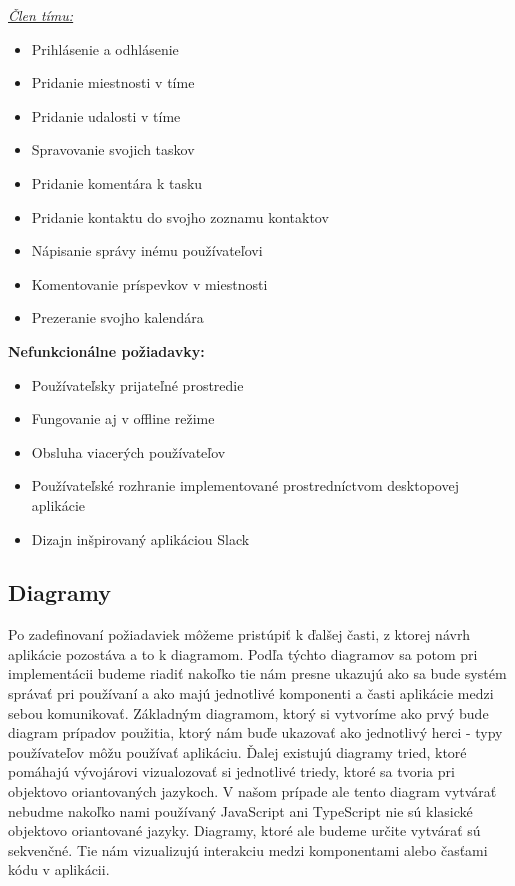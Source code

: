 \underline{\textit{Člen tímu:}}
\indent\begin{itemize}
    \item Prihlásenie a odhlásenie
    \item Pridanie miestnosti v tíme 
    \item Pridanie udalosti v tíme
    \item Spravovanie svojich taskov
    \item Pridanie komentára k tasku
    \item Pridanie kontaktu do svojho zoznamu kontaktov
    \item Nápisanie správy inému používateľovi
    \item Komentovanie príspevkov v miestnosti
    \item Prezeranie svojho kalendára\newline
\end{itemize}


\textbf{Nefunkcionálne požiadavky:}
\indent\begin{itemize}
    \item Používateľsky prijateľné prostredie
    \item Fungovanie aj v offline režime
    \item Obsluha viacerých používateľov
    \item Používateľské rozhranie implementované prostredníctvom desktopovej aplikácie
    \item Dizajn inšpirovaný aplikáciou Slack
\end{itemize}

\subsection{Diagramy}
\indent Po zadefinovaní požiadaviek môžeme pristúpiť k ďalšej časti, z ktorej návrh aplikácie pozostáva a to k diagramom. Podľa týchto diagramov sa potom pri implementácii budeme riadiť nakoľko tie nám presne ukazujú ako sa bude systém správať pri používaní a ako majú jednotlivé komponenti a časti aplikácie medzi sebou komunikovať. Základným diagramom, ktorý si vytvoríme ako prvý bude diagram prípadov použitia, ktorý nám buďe ukazovať ako jednotlivý herci - typy používateľov môžu používať aplikáciu. Ďalej existujú diagramy tried, ktoré pomáhajú vývojárovi vizualozovať si jednotlivé triedy, ktoré sa tvoria pri objektovo oriantovaných jazykoch. V našom prípade ale tento diagram vytvárať nebudme nakoľko nami používaný JavaScript ani TypeScript nie sú klasické objektovo oriantované jazyky. Diagramy, ktoré ale budeme určite vytvárať sú sekvenčné. Tie nám vizualizujú interakciu medzi komponentami alebo časťami kódu v aplikácii.

